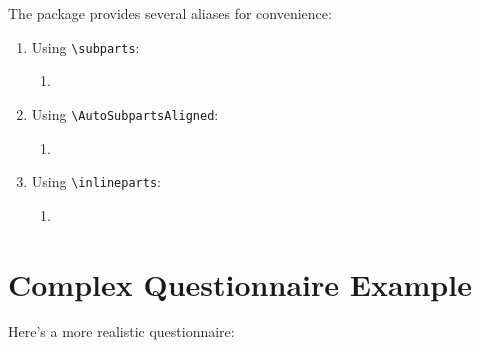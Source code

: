 \documentclass[11pt]{article}
\begin{document}
The package provides several aliases for convenience:

\begin{enumerate}[mainq]
  \item Using \texttt{\textbackslash subparts}:
  \begin{enumerate}[subq]
    \item {}
  \end{enumerate}
  
  \item Using \texttt{\textbackslash AutoSubpartsAligned}:
  \begin{enumerate}[subq]
    \item {}
  \end{enumerate}
  
  \setenumsubitemwidth{2cm}
  \item Using \texttt{\textbackslash inlineparts}:
  \begin{enumerate}[subq]
    \item {}
  \end{enumerate}
\end{enumerate}

\section{Complex Questionnaire Example}

Here's a more realistic questionnaire:

\setenumsublabelwidth{2.2em}
\setenumsubitemwidth{1.5cm}
\end{document}
